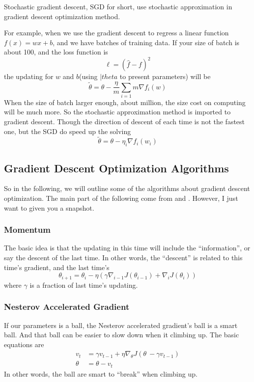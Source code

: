 \documentclass[twoside]{article}
\begin{document}
Stochastic gradient descent, SGD for short, use stochastic approximation in gradient descent optimization method.

For example, when we use the gradient descent to regress a linear function $f(x) = wx+b$, and we have batches of training data.
If your size of batch is about 100, and the loss function is
\[
\ell = (\hat{f} - f)^2
\]
the updating for $w$ and $b$(using $|theta$ to present parameters) will be
\[
\tilde{\theta} = \theta - \frac{\eta}{m}\sum\limits_{i=1}{m}\nabla f_i(w)
\]
When the size of batch larger enough, about million, the size cost on computing will be much more.
So the stochastic approximation method is imported to gradient descent. Though the direction of descent of each time is not
the fastest one, but the SGD do speed up the solving
\[
\tilde{\theta} = \theta - \eta _i\nabla f_i(w_i)
\]

\subsection{Gradient Descent Optimization Algorithms}
\label{sec:gd:gdoa}

So in the following, we will outline some of the algorithms about gradient descent optimization. The main part of the following come from
\cite{DBLP:journals/corr/Ruder16} and \cite{wikipedia:sgd}. However, I just want to given you a snapshot.

\subsubsection{Momentum}
\label{sec:gd:gdoa:momentum}

The basic idea is that the updating in this time will include the ``information'', or say the descent of the last time.
In other words, the ``descent'' is related to this time's gradient, and the last time's
\[
\theta_{i+1} = \theta_i - \eta\left(\gamma\nabla_{i-1}J(\theta_{i-1}) + \nabla_iJ(\theta_i)\right)
\]
where $\gamma$ is a fraction of last time's updating.

\subsubsection{Nesterov Accelerated Gradient}
\label{sec:gd:gdoa:nag}

If our parameters is a ball, the Nesterov accelerated gradient's ball is a smart ball. And that ball can be easier to slow down when it climbing up.
The basic equations are
\begin{align*}
v_t &= \gamma v_{t-1} + \eta\nabla_\theta J(\theta\ -\gamma v_{t-1}) \\
\theta &= \theta - v_t
\end{align*}
In other words, the ball are smart to ``break'' when climbing up.
\end{document}
